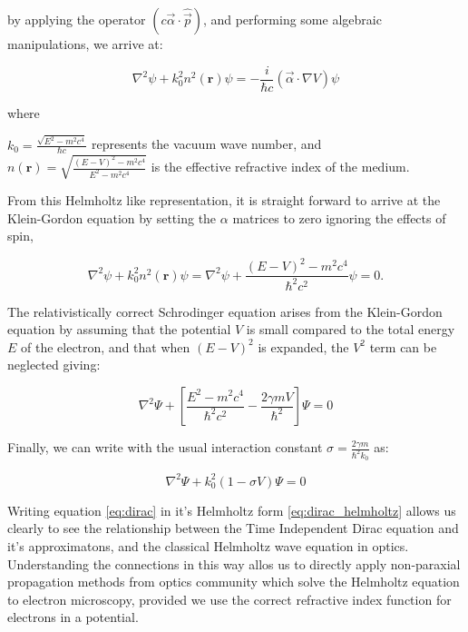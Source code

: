 \documentclass{article}
\begin{document}
by applying the operator $\left( c \vec{\alpha} \cdot \hat{\vec{p}} \right)$, and performing some algebraic manipulations, we arrive at:

\begin{equation}
\label{eq:dirac_helmholtz}
\nabla^2 \psi + k_0^2 n^2(\mathbf{r}) \psi = - \frac{i}{\hbar c} (\vec{\alpha} \cdot \nabla V) \psi
\end{equation}

where

$k_0 = \frac{\sqrt{E^2 - m^2c^4}}{\hbar c}$ represents the vacuum wave number, and $n(\mathbf{r}) = \sqrt{\frac{(E-V)^2 - m^2c^4}{E^2 - m^2c^4}}$ is the effective refractive index of the medium.

From this Helmholtz like representation, it is straight forward to arrive at the Klein-Gordon equation by setting the $\alpha$ matrices to zero ignoring the effects of spin, 

\begin{equation}
\label{eq:klein_gordon}
\nabla^2 \psi + k_0^2 n^2(\mathbf{r}) \psi = \nabla^2 \psi + \frac{(E - V)^2 - m^2c^4}{\hbar^2 c^2} \psi = 0.
\end{equation}

The relativistically correct Schrodinger equation arises from the Klein-Gordon equation by assuming that the potential $V$ 
is small compared to the total energy $E$ of the electron, and that when $(E - V)^2$ is expanded, the $V^2$ term can be neglected giving:

\begin{equation}
\label{eq:rel_schrodinger}
\nabla^2 \Psi + \left[ \frac{E^2 - m^2 c^4}{\hbar^2 c^2} - \frac{2\gamma m V}{\hbar^2} \right] \Psi = 0
\end{equation}

Finally, we can write \cite{eq:rel_schrodinger} with the usual interaction constant $\sigma = \frac{2\gamma m}{\hbar^2 k_0}$ as:

\begin{equation}
\label{eq:rel_schrodinger_interaction}
\nabla^2 \Psi + k_0^2 (1 - \sigma V) \Psi = 0
\end{equation}

Writing equation \eqref{eq:dirac} in it's Helmholtz form \eqref{eq:dirac_helmholtz} allows us clearly to see the relationship between the Time Independent Dirac equation and it's approximatons,
and the classical Helmholtz wave equation in optics. Understanding the connections in this way allos us to directly apply non-paraxial propagation methods from optics community which solve 
the Helmholtz equation to electron microscopy, provided we use the correct refractive index function for electrons in a potential. 
\end{document}
